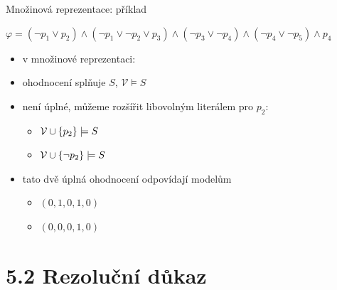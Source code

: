 \documentclass{beamer}
\begin{document}
\begin{frame}{Množinová reprezentace: příklad}
    
    $\varphi=(\neg p_1\lor p_2)\land(\neg p_1\lor\neg p_2\lor p_3)\land(\neg p_3\lor\neg p_4)\land(\neg p_4\lor \neg p_5)\land p_4$ 
    
    \pause

    \begin{itemize}
        \item v množinové reprezentaci:
        \pause
        \item ohodnocení  
        splňuje $S$, \alert{$\mathcal V\models S$}\pause
        \item není úplné, můžeme rozšířit libovolným literálem pro $p_2$: \pause
        \begin{itemize}
            \item \alert{$\mathcal V\mathbin{\cup}\{p_2\}\models S$}\pause
            \item \alert{$\mathcal V\mathbin{\cup}\{\neg p_2\}\models S$}\pause
        \end{itemize}        
        \item tato dvě úplná ohodnocení odpovídají modelům
         \begin{itemize}
            \item $(0,1,0,1,0)$
            \item $(0,0,0,1,0)$
         \end{itemize}
    \end{itemize}

\end{frame}


\section{5.2 Rezoluční důkaz}
\end{document}
